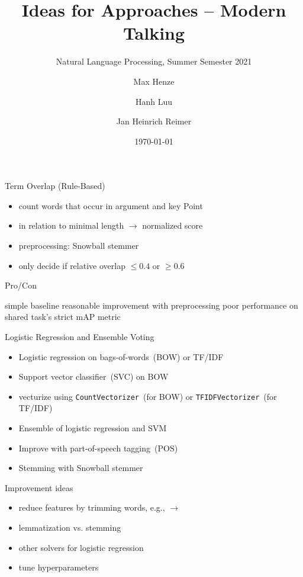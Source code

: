 \documentclass[english,handout]{mlutalk}
\title{Ideas for Approaches -- Modern Talking}
\subtitle{Natural Language Processing, Summer Semester 2021}
\author{Max Henze \and Hanh Luu \and Jan Heinrich Reimer}
\institute{Martin Luther University Halle-Wittenberg}
\date{\today}
\newcommand{\TFIDF}{\mbox{TF/IDF}\xspace}
\newcommand{\mAP}{\mbox{mAP}\xspace}
\begin{document}
\titleframe

\begin{frame}{Term Overlap (Rule-Based)}
  \begin{itemize}
    \item count words that occur in argument and key Point
    \item in relation to minimal length \(\to\) normalized score
    \item preprocessing: Snowball stemmer~\cite{Porter1980}
    \item only decide if relative overlap \(\leq 0.4\) or \(\geq 0.6\)
  \end{itemize}

  \begin{block}{Pro/Con}
    \begin{itemize}
      \pro simple baseline
      \pro reasonable improvement with preprocessing
      \con poor performance on shared task's strict \mAP metric
    \end{itemize}
  \end{block}
\end{frame}

\begin{frame}[allowframebreaks]{Logistic Regression and Ensemble Voting}

  \begin{itemize}
    \item Logistic regression on bags-of-words~(BOW) or \TFIDF \\
    \item Support vector classifier~(SVC) on BOW
    \item vecturize using \lstinline{CountVectorizer}~(for BOW) or \lstinline{TFIDFVectorizer}~(for \TFIDF)
    \item Ensemble of logistic regression and SVM
    \item Improve with part-of-speech tagging~(POS) %
    \item Stemming with Snowball stemmer~\cite{Porter1980}
  \end{itemize}

  \begin{block}{Improvement ideas}
  \begin{itemize}
      \item reduce features by trimming words, e.g.,  \(\to\) 
      \item lemmatization vs. stemming
      \item other solvers for logistic regression
      \item tune hyperparameters
  \end{itemize}
  \end{block}
\end{frame}
\end{document}
